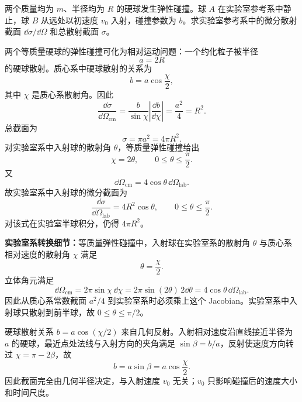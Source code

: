 \begin{question}[硬球弹性碰撞的散射截面]
两个质量均为 $m$、半径均为 $R$ 的硬球发生弹性碰撞。球 $A$ 在实验室参考系中静止，球 $B$ 从远处以初速度 $v_0$ 入射，碰撞参数为 $b$。求实验室参考系中的微分散射截面 $\dd\sigma/\dd\Omega$ 和总散射截面 $\sigma$。

\begin{solution}
两个等质量硬球的弹性碰撞可化为相对运动问题：一个约化粒子被半径
\[
  a=2R
\]
的硬球散射。质心系中硬球散射的关系为
\[
  b=a\cos\frac\chi2,
\]
其中 $\chi$ 是质心系散射角。因此
\[
  \frac{\dd\sigma}{\dd\Omega_{\mathrm{cm}}}
  =\frac{b}{\sin\chi}\left|\frac{\dd b}{\dd\chi}\right|
  =\frac{a^2}{4}=R^2.
\]
总截面为
\[
  \boxed{\sigma=\pi a^2=4\pi R^2}.
\]
对实验室系中入射球的散射角 $\theta$，等质量弹性碰撞给出
\[
  \chi=2\theta,
  \qquad 0\le\theta\le\frac\pi2.
\]
又
\[
  \dd\Omega_{\mathrm{cm}}=4\cos\theta\,\dd\Omega_{\mathrm{lab}}.
\]
故实验室系中入射球的微分截面为
\[
  \boxed{\frac{\dd\sigma}{\dd\Omega_{\mathrm{lab}}}
  =4R^2\cos\theta,
  \qquad 0\le\theta\le\frac\pi2.}
\]
对该式在实验室半球积分，仍得 $4\pi R^2$。


\medskip
\textbf{实验室系转换细节：}等质量弹性碰撞中，入射球在实验室系的散射角 $\theta$ 与质心系相对速度的散射角 $\chi$ 满足
\[
  \theta=\frac{\chi}{2}.
\]
立体角元满足
\[
  \dd\Omega_{\mathrm{cm}}=2\pi\sin\chi\,\dd\chi
  =2\pi\sin(2\theta)\,2\dd\theta
  =4\cos\theta\,\dd\Omega_{\mathrm{lab}}.
\]
因此从质心系常数截面 $a^2/4$ 到实验室系时必须乘上这个 Jacobian。实验室系中入射球只散射到前半球，故 $0\le\theta\le\pi/2$。


\medskip
硬球散射关系 $b=a\cos(\chi/2)$ 来自几何反射。入射相对速度沿直线接近半径为 $a$ 的硬球，最近点处法线与入射方向的夹角满足 $\sin\beta=b/a$，反射使速度方向转过 $\chi=\pi-2\beta$，故
\[
  b=a\sin\beta=a\cos\frac\chi2.
\]
因此截面完全由几何半径决定，与入射速度 $v_0$ 无关；$v_0$ 只影响碰撞后的速度大小和时间尺度。
\end{solution}
\end{question}

